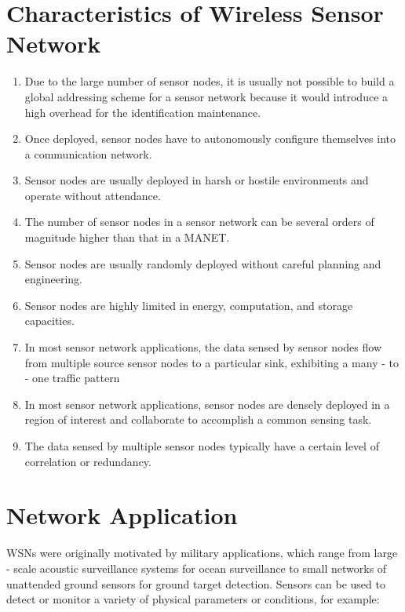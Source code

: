 \section{Characteristics of Wireless Sensor Network}
\begin{enumerate}[label=\roman*]
  \item  Due to the large number of sensor nodes, it is usually not possible to build a global addressing scheme for a sensor network because it would introduce a high overhead for the identification maintenance.
  \item  Once deployed, sensor nodes have to autonomously configure themselves into a communication network.
  \item	Sensor nodes are usually deployed in harsh or hostile environments and operate without attendance.
  \item	The number of sensor nodes in a sensor network can be several orders of magnitude higher than that in a MANET.
  \item	Sensor nodes are usually randomly deployed without careful planning and engineering.
  \item	Sensor nodes are highly limited in energy, computation, and storage capacities.
  \item	In most sensor network applications, the data sensed by sensor nodes flow from multiple source sensor nodes to a particular sink, exhibiting a many - to - one traffic pattern
  \item	In most sensor network applications, sensor nodes are densely deployed in a region of interest and collaborate to accomplish a common sensing task.
  \item	The data sensed by multiple sensor nodes typically have a certain level of correlation or redundancy.   
\end{enumerate}
%

\section{Network Application}
WSNs were originally motivated by military applications, which range from large - scale acoustic surveillance systems for ocean surveillance to small networks of unattended ground sensors for ground target detection. Sensors can be used to detect or monitor a variety of physical parameters or conditions, for example:


